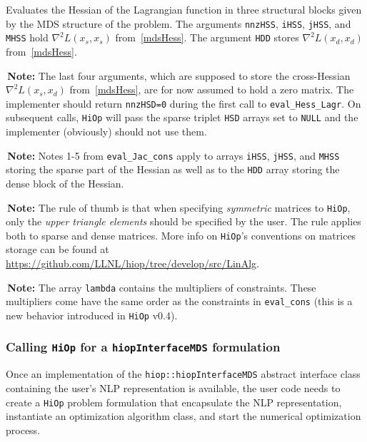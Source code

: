 \documentclass[11pt]{article}
\newcommand{\warningSymbol}{\raisebox{0.9\depth}{\danger}}
\newcommand{\warningcp}[1]{%
        \smallskip \noindent \textcolor{warningColorText}{\warningSymbol{}}\,\textbf{#1} %
    }
\newcommand{\Hi}{\texttt{HiOp}\xspace}
\begin{document}
\noindent Evaluates the Hessian of the Lagrangian function in three structural blocks given by the MDS structure of the problem. The arguments \texttt{nnzHSS}, \texttt{iHSS}, \texttt{jHSS}, and \texttt{MHSS} hold  $\nabla^2 L(x_s,x_s)$ from~\eqref{mdsHess}. The argument \texttt{HDD} stores $\nabla^2 L(x_d,x_d)$ from~\eqref{mdsHess}. 


\warningcp{Note:} The last four arguments, which are supposed to store the cross-Hessian $\nabla^2 L(x_s,x_d)$ from~\eqref{mdsHess}, are for now assumed to hold a zero matrix. The implementer should return \texttt{nnzHSD=0} during the first call to \texttt{eval\_Hess\_Lagr}. On subsequent calls, \Hi will pass the sparse triplet \texttt{HSD} arrays   set to \texttt{NULL} and the implementer (obviously) should not use them.
 
 
\warningcp{Note:} Notes 1-5 from \texttt{eval\_Jac\_cons} apply to arrays \texttt{iHSS}, \texttt{jHSS}, and \texttt{MHSS} storing the sparse part of the Hessian as well as to the \texttt{HDD} array storing the dense block of the Hessian. 

\warningcp{Note:} The rule of thumb is that when specifying \textit{symmetric} matrices to \Hi, only the \textit{upper triangle elements} should be specified by the user. The rule applies both to sparse and dense matrices. More info on \Hi's conventions on matrices storage can be found at \url{https://github.com/LLNL/hiop/tree/develop/src/LinAlg}.


\warningcp{Note:} The array \texttt{lambda} contains  the multipliers of constraints. These multipliers come have the same order as the constraints in \texttt{eval\_cons} (this is a new behavior introduced in \Hi v0.4).

\subsubsection{Calling \Hi for a \texttt{hiopInterfaceMDS} formulation}
Once an implementation of the \texttt{hiop::hiopInterfaceMDS} abstract interface class containing the user's NLP representation is available, the  user code needs to create a \Hi problem formulation that encapsulate the NLP representation, instantiate an optimization algorithm class, and start the numerical optimization process. 
\end{document}
